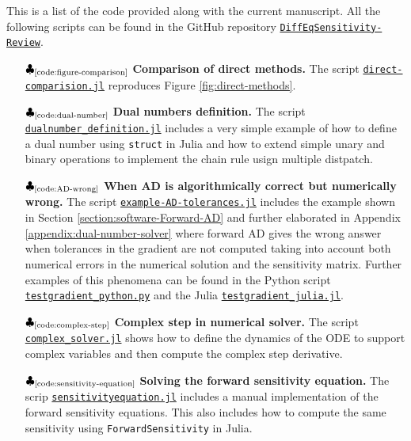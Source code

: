 This is a list of the code provided along with the current manuscript.
All the following scripts can be found in the GitHub repository \href{https://github.com/ODINN-SciML/DiffEqSensitivity-Review}{\texttt{DiffEqSensitivity-Review}}. 
 
\begin{itemize}
    \item[$\clubsuit_\text{\ref{code:figure-comparison}}$] \textbf{Comparison of direct methods.} The script \href{https://github.com/ODINN-SciML/DiffEqSensitivity-Review/blob/main/code/DirectMethods/Comparison/direct-comparision.jl}{\texttt{direct-comparision.jl}} reproduces Figure \ref{fig:direct-methods}.
    \item[$\clubsuit_\text{\ref{code:dual-number}}$] \textbf{Dual numbers definition.} The script \href{https://github.com/ODINN-SciML/DiffEqSensitivity-Review/blob/main/code/DirectMethods/DualNumbers/dualnumber_definition.jl}{\texttt{dualnumber\_definition.jl}} includes a very simple example of how to define a dual number using \texttt{struct} in Julia and how to extend simple unary and binary operations to implement the chain rule usign multiple distpatch. 
    \item[$\clubsuit_\text{\ref{code:AD-wrong}}$] \textbf{When AD is algorithmically correct but numerically wrong.} The script \href{https://github.com/ODINN-SciML/DiffEqSensitivity-Review/blob/main/code/SensitivityForwardAD/example-AD-tolerances.jl}{\texttt{example-AD-tolerances.jl}} includes the example shown in Section \ref{section:software-Forward-AD} and further elaborated in Appendix \ref{appendix:dual-number-solver} where forward AD gives the wrong answer when tolerances in the gradient are not computed taking into account both numerical errors in the numerical solution and the sensitivity matrix. Further examples of this phenomena can be found in the Python script \href{https://github.com/ODINN-SciML/DiffEqSensitivity-Review/blob/main/code/SensitivityForwardAD/testgradient_python.py}{\texttt{testgradient\_python.py}} and the Julia \href{https://github.com/ODINN-SciML/DiffEqSensitivity-Review/blob/main/code/SensitivityForwardAD/testgradient_julia.jl}{\texttt{testgradient\_julia.jl}}.
    \item[$\clubsuit_\text{\ref{code:complex-step}}$] \textbf{Complex step in numerical solver.} The script \href{https://github.com/ODINN-SciML/DiffEqSensitivity-Review/blob/main/code/DirectMethods/ComplexStep/complex_solver.jl}{\texttt{complex\_solver.jl}} shows how to define the dynamics of the ODE to support complex variables and then compute the complex step derivative. 
    \item[$\clubsuit_\text{\ref{code:sensitivity-equation}}$] \textbf{Solving the forward sensitivity equation. } The scrip \href{https://github.com/ODINN-SciML/DiffEqSensitivity-Review/blob/main/code/SolverMethods/sensitivityequation.jl}{\texttt{sensitivityequation.jl}} includes a manual implementation of the  forward sensitivity equations. This also includes how to compute the same sensitivity using \texttt{ForwardSensitivity} in Julia.  
\end{itemize}